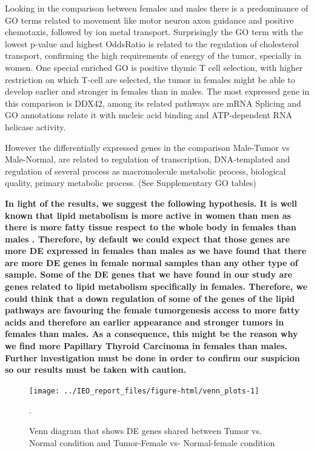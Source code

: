 \documentclass[9pt,twocolumn,twoside]{gsajnl}
\begin{document}
Looking in the comparison between females and males there is a predominance of GO terms related to movement like motor neuron axon guidance and positive chemotaxis, followed by ion metal transport. Surprisingly the GO term with the lowest p-value and highest OddsRatio is related to the regulation of cholesterol transport, confirming the high requirements of energy of the tumor, specially in women. One special enriched GO is positive thymic T cell selection, with higher restriction on which T-cell are selected, the tumor in females might be able to develop earlier and stronger in females than in males. The most expressed gene in this comparison is DDX42, among its related pathways are mRNA Splicing and GO annotations relate it with nucleic acid binding and ATP-dependent RNA helicase activity.


However the differentially expressed genes in the comparison Male-Tumor vs Male-Normal, are related to regulation of transcription, DNA-templated and regulation of several process as macromolecule metabolic process, biological quality, primary metabolic process. (See Supplementary GO tables)

\textbf{In light of the results, we suggest the following hypothesis. It is well known that lipid metabolism is more active in women than men as there is more fatty tissue respect to the whole body in females than males \citep{Blaak2001}. Therefore, by default we could expect that those genes are more DE expressed in females than males as we have found that there are more DE genes in female normal samples than any other type of sample. Some of the DE genes that we have found in our study are genes related to lipid metabolism specifically in females. Therefore, we could think that a down regulation of some of the genes of the lipid pathways are favouring the female tumorgenesis access to more fatty acids and therefore an earlier appearance and stronger tumors in females than males. As a consequence, this might be the reason why we find more Papillary Thyroid Carcinoma in females than males. Further investigation must be done in order to confirm our suspicion so our results must be taken with caution.}
 
\begin{figure}
\centering
\texttt{[image: ../IEO\_report\_files/figure-html/venn\_plots-1]}
\caption{Venn diagram that shows DE genes shared between Tumor vs. Normal condition and Tumor-Female vs- Normal-female condition }.
\label{fig:venn1}
\end{figure}

  

\end{document}
